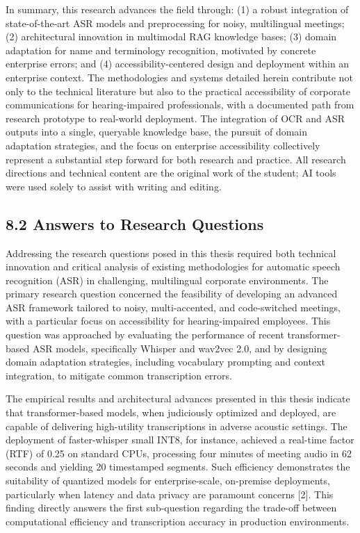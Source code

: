 \documentclass[12pt,a4paper]{article}
\begin{document}
In summary, this research advances the field through: (1) a robust integration of state-of-the-art ASR models and preprocessing for noisy, multilingual meetings; (2) architectural innovation in multimodal RAG knowledge bases; (3) domain adaptation for name and terminology recognition, motivated by concrete enterprise errors; and (4) accessibility-centered design and deployment within an enterprise context. The methodologies and systems detailed herein contribute not only to the technical literature but also to the practical accessibility of corporate communications for hearing-impaired professionals, with a documented path from research prototype to real-world deployment. The integration of OCR and ASR outputs into a single, queryable knowledge base, the pursuit of domain adaptation strategies, and the focus on enterprise accessibility collectively represent a substantial step forward for both research and practice. All research directions and technical content are the original work of the student; AI tools were used solely to assist with writing and editing.


\subsection{8.2 Answers to Research Questions}


Addressing the research questions posed in this thesis required both technical innovation and critical analysis of existing methodologies for automatic speech recognition (ASR) in challenging, multilingual corporate environments. The primary research question concerned the feasibility of developing an advanced ASR framework tailored to noisy, multi-accented, and code-switched meetings, with a particular focus on accessibility for hearing-impaired employees. This question was approached by evaluating the performance of recent transformer-based ASR models, specifically Whisper and wav2vec 2.0, and by designing domain adaptation strategies, including vocabulary prompting and context integration, to mitigate common transcription errors.


The empirical results and architectural advances presented in this thesis indicate that transformer-based models, when judiciously optimized and deployed, are capable of delivering high-utility transcriptions in adverse acoustic settings. The deployment of faster-whisper small INT8, for instance, achieved a real-time factor (RTF) of 0.25 on standard CPUs, processing four minutes of meeting audio in 62 seconds and yielding 20 timestamped segments. Such efficiency demonstrates the suitability of quantized models for enterprise-scale, on-premise deployments, particularly when latency and data privacy are paramount concerns [2]. This finding directly answers the first sub-question regarding the trade-off between computational efficiency and transcription accuracy in production environments.
\end{document}
